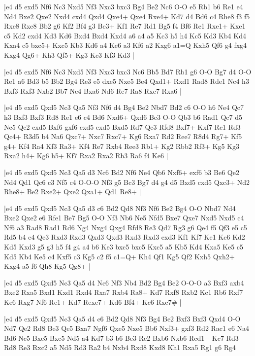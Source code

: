 \whitename{}
\blackname{}
\makegametitle
|e4 d5 exd5 Nf6 Nc3 Nxd5 Nf3 Nxc3 bxc3 Bg4 Be2 Nc6 O-O e5 Rb1 b6 Re1 e4 Nd4 Bxe2 Qxe2 Nxd4 cxd4 Qxd4 Qxe4+ Qxe4 Rxe4+ Kd7 d4 Bd6 c4 Rhe8 f3 f5 Rxe8 Rxe8 Bb2 g6 Kf2 Bf4 g3 Be3+ Kf1 Re7 Rd1 Bg5 f4 Bf6 Re1 Rxe1+ Kxe1 c5 Kd2 cxd4 Kd3 Kd6 Bxd4 Bxd4 Kxd4 a6 a4 a5 Kc3 h5 h4 Kc5 Kd3 Kb4 Kd4 Kxa4 c5 bxc5+ Kxc5 Kb3 Kd6 a4 Ke6 a3 Kf6 a2 Kxg6 a1=Q Kxh5 Qf6 g4 fxg4 Kxg4 Qg6+ Kh3 Qf5+ Kg3 Kc3 Kf3 Kd3  |

\whitename{}
\blackname{}
\makegametitle
|e4 d5 exd5 Nf6 Nc3 Nxd5 Nf3 Nxc3 bxc3 Nc6 Bb5 Bd7 Rb1 g6 O-O Bg7 d4 O-O Re1 a6 Bd3 b5 Bb2 Bg4 Re3 e5 dxe5 Nxe5 Be4 Qxd1+ Rxd1 Rad8 Rde1 Nc4 h3 Bxf3 Rxf3 Nxb2 Bb7 Nc4 Bxa6 Nd6 Re7 Ra8 Rxc7 Rxa6  |

\whitename{}
\blackname{}
\makegametitle
|e4 d5 exd5 Qxd5 Nc3 Qa5 Nf3 Nf6 d4 Bg4 Be2 Nbd7 Bd2 c6 O-O h6 Ne4 Qc7 h3 Bxf3 Bxf3 Rd8 Re1 e6 c4 Bd6 Nxd6+ Qxd6 Bc3 O-O Qb3 b6 Rad1 Qc7 d5 Nc5 Qc2 cxd5 Bxf6 gxf6 cxd5 exd5 Bxd5 Rd7 Qc3 Rfd8 Bxf7+ Kxf7 Rc1 Rd3 Qc4+ R3d5 b4 Na6 Qxc7+ Nxc7 Rxc7+ Kg6 Rxa7 Rd2 Ree7 R8d4 Rg7+ Kf5 g4+ Kf4 Ra4 Kf3 Ra3+ Kf4 Re7 Rxb4 Ree3 Rb1+ Kg2 Rbb2 Rf3+ Kg5 Kg3 Rxa2 h4+ Kg6 h5+ Kf7 Rxa2 Rxa2 Rb3 Ra6 f4 Ke6  |

\whitename{}
\blackname{}
\makegametitle
|e4 d5 exd5 Qxd5 Nc3 Qa5 d3 Nc6 Bd2 Nf6 Ne4 Qb6 Nxf6+ exf6 b3 Be6 Qe2 Nd4 Qd1 Qc6 c3 Nf5 c4 O-O-O Nf3 g5 Bc3 Bg7 d4 g4 d5 Bxd5 cxd5 Qxc3+ Nd2 Rhe8+ Be2 Rxe2+ Qxe2 Qxa1+ Qd1 Re8+  |

\whitename{}
\blackname{}
\makegametitle
|e4 d5 exd5 Qxd5 Nc3 Qa5 d3 c6 Bd2 Qd8 Nf3 Nf6 Be2 Bg4 O-O Nbd7 Nd4 Bxe2 Qxe2 e6 Rfe1 Be7 Bg5 O-O Nf3 Nb6 Ne5 Nfd5 Bxe7 Qxe7 Nxd5 Nxd5 c4 Nf6 a3 Rad8 Rad1 Rd6 Ng4 Nxg4 Qxg4 Rfd8 Re3 Qd7 Rg3 g6 Qe4 f5 Qf3 e5 c5 Rd5 b4 e4 Qe3 Rxd3 Rxd3 Qxd3 Qxd3 Rxd3 Rxd3 exd3 Kf1 Kf7 Ke1 Ke6 Kd2 Kd5 Kxd3 g5 g3 h5 f4 g4 a4 b6 Ke3 bxc5 bxc5 Kxc5 a5 Kb5 Kd4 Kxa5 Ke5 c5 Kd5 Kb4 Ke5 c4 Kxf5 c3 Kg5 c2 f5 c1=Q+ Kh4 Qf1 Kg5 Qf2 Kxh5 Qxh2+ Kxg4 a5 f6 Qh8 Kg5 Qg8+  |

\whitename{}
\blackname{}
\makegametitle
|e4 d5 exd5 Qxd5 Nc3 Qa5 d4 Nc6 Nf3 Nb4 Bd2 Bg4 Be2 O-O-O a3 Bxf3 axb4 Bxe2 Rxa5 Bxd1 Kxd1 Rxd4 Rxa7 Rxb4 Ra8+ Kd7 Rxf8 Rxb2 Kc1 Rb6 Rxf7 Ke6 Rxg7 Nf6 Re1+ Kd7 Rexe7+ Kd6 Bf4+ Kc6 Rxc7\#  |

\whitename{}
\blackname{}
\makegametitle
|e4 d5 exd5 Qxd5 Nc3 Qa5 d4 c6 Bd2 Qd8 Nf3 Bg4 Be2 Bxf3 Bxf3 Qxd4 O-O Nd7 Qe2 Rd8 Be3 Qe5 Bxa7 Ngf6 Qxe5 Nxe5 Bb6 Nxf3+ gxf3 Rd2 Rac1 e6 Na4 Bd6 Nc5 Bxc5 Bxc5 Nd5 a4 Kd7 b3 b6 Be3 Re2 Bxb6 Nxb6 Rcd1+ Kc7 Rd3 Rd8 Re3 Rxc2 a5 Nd5 Rd3 Ra2 b4 Nxb4 Rxd8 Kxd8 Kh1 Rxa5 Rg1 g6 Rg4  |

